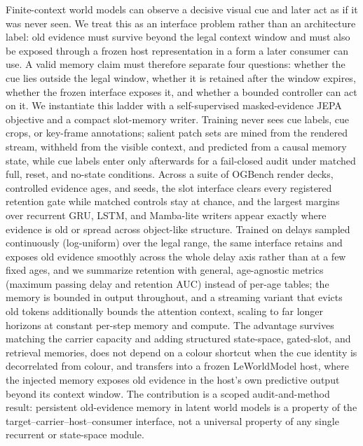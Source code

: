 Finite-context world models can observe a decisive visual cue and later act as
if it was never seen.  We treat this as an interface problem rather than an
architecture label: old evidence must survive beyond the legal context window
and must also be exposed through a frozen host representation in a form a later
consumer can use.  A valid memory claim must therefore separate four questions:
whether the cue lies outside the legal window, whether it is retained after the
window expires, whether the frozen interface exposes it, and whether a bounded
controller can act on it.  We instantiate this ladder with a self-supervised
masked-evidence JEPA objective and a compact slot-memory writer.  Training never
sees cue labels, cue crops, or key-frame annotations; salient patch sets are
mined from the rendered stream, withheld from the visible context, and predicted
from a causal memory state, while cue labels enter only afterwards for a
fail-closed audit under matched full, reset, and no-state conditions.  Across a
suite of OGBench render decks, controlled evidence ages, and seeds, the slot
interface clears every registered retention gate while matched controls stay at
chance, and the largest margins over recurrent GRU, LSTM, and Mamba-lite writers
appear exactly where evidence is old or spread across object-like structure.
Trained on delays sampled continuously (log-uniform) over the legal range, the
same interface retains and exposes old evidence smoothly across the whole delay
axis rather than at a few fixed ages, and we summarize retention with general,
age-agnostic metrics (maximum passing delay and retention AUC) instead of
per-age tables; the memory is bounded in output throughout, and a streaming
variant that evicts
old tokens additionally bounds the attention context, scaling to far longer
horizons at constant per-step memory and compute.  The
advantage survives matching the carrier capacity and adding structured
state-space, gated-slot, and retrieval memories, does not depend on a colour
shortcut when the cue identity is decorrelated from colour, and transfers into a
frozen LeWorldModel host, where the injected memory exposes old evidence in the
host's own predictive output beyond its context window.  The contribution is a
scoped audit-and-method result: persistent old-evidence memory in latent world
models is a property of the target--carrier--host--consumer interface, not a
universal property of any single recurrent or state-space module.
